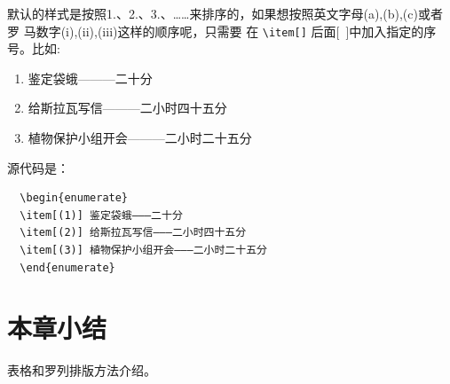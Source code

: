默认的样式是按照1.、2.、3.、……来排序的，如果想按照英文字母(a),(b),(c)或者罗
马数字(i),(ii),(iii)这样的顺序呢，只需要
在 \verb|\item[]| 后面[~]中加入指定的序号。比如:
\begin{enumerate}
  \item[(1)] 鉴定袋蛾———二十分
  \item[(2)] 给斯拉瓦写信———二小时四十五分
  \item[(3)] 植物保护小组开会———二小时二十五分
\end{enumerate}
源代码是：
\begin{lstlisting}
  \begin{enumerate}
  \item[(1)] 鉴定袋蛾———二十分
  \item[(2)] 给斯拉瓦写信———二小时四十五分
  \item[(3)] 植物保护小组开会———二小时二十五分
  \end{enumerate}
\end{lstlisting}

\section*{本章小结}
表格和罗列排版方法介绍。
